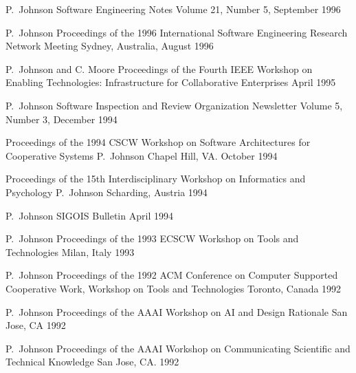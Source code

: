 \documentclass[11pt,letterpaper,sans]{moderncv} %
\begin{document}
          {P.~Johnson}
          {Software Engineering Notes}
          {Volume 21, Number 5, September 1996}

          {P.~Johnson}
          {Proceedings of the 1996 International Software Engineering Research Network Meeting}
          {Sydney, Australia, August 1996}

          {P.~Johnson and C. Moore}
          {Proceedings of the Fourth IEEE Workshop on Enabling Technologies: Infrastructure for Collaborative Enterprises}
          {April 1995}

          {P.~Johnson}
          {Software Inspection and Review Organization Newsletter}
          {Volume 5, Number 3, December 1994}

          {Proceedings of the 1994 CSCW Workshop on Software Architectures for Cooperative Systems}
          {P.~Johnson}
          {Chapel Hill, VA. October 1994}

          {Proceedings of the 15th Interdisciplinary Workshop on Informatics and Psychology}
          {P.~Johnson}
          {Scharding, Austria 1994}

          {P.~Johnson}
          {SIGOIS Bulletin}
          {April 1994}

          {P.~Johnson}
          {Proceedings of the 1993 ECSCW Workshop on Tools and Technologies}
          {Milan, Italy 1993}

          {P.~Johnson}
          {Proceedings of the 1992 ACM Conference on Computer Supported Cooperative Work, Workshop on Tools and Technologies}
          {Toronto, Canada 1992}

          {P.~Johnson}
          {Proceedings of the AAAI Workshop on AI and Design Rationale}
          {San Jose, CA 1992}

          {P.~Johnson}
          {Proceedings of the AAAI Workshop on Communicating Scientific and Technical Knowledge}
          {San Jose, CA. 1992}
\end{document}
